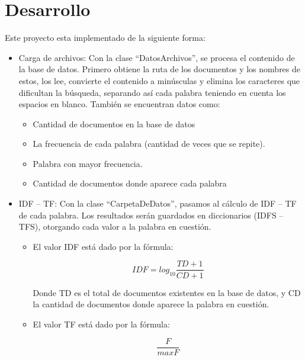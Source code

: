 \documentclass[a4paper, 12pt]{article}
\begin{document}
	\section {Desarrollo}
		Este proyecto esta implementado de la siguiente forma:
\begin{itemize}
\item Carga de archivos:
Con la clase “DatosArchivos”, se procesa el contenido de la base de datos. Primero obtiene 
la ruta de los documentos y los nombres de estos, los lee, convierte el contenido a 
minúsculas y elimina los caracteres que dificultan la búsqueda, separando así cada palabra 
teniendo en cuenta los espacios en blanco.
También se encuentran datos como:
		\begin{itemize}
\item Cantidad de documentos en la base de datos
\item La frecuencia de cada palabra (cantidad de veces que se repite).
\item  Palabra con mayor frecuencia.
\item Cantidad de documentos donde aparece cada palabra
		\end{itemize}
\item IDF – TF:
Con la clase “CarpetaDeDatos”, pasamos al cálculo de IDF – TF de cada palabra. Los 
resultados serán guardados en diccionarios (IDFS – TFS), otorgando cada valor a la palabra 
en cuestión.
		\begin{itemize}
\item El valor IDF está dado por la fórmula:
	\begin{center}
		$$
			IDF=log_{10}{\frac{TD+1}{CD+1}}
		$$
	\end{center} 
Donde TD es el total de documentos existentes en la base de datos, y CD la cantidad de 
documentos donde aparece la palabra en cuestión.
\item El valor TF está dado por la fórmula:
	\begin{center}
		$$
			\frac{F}{maxF}
		$$
	\end{center}


\end{itemize}
\end{itemize}
\end{document}
